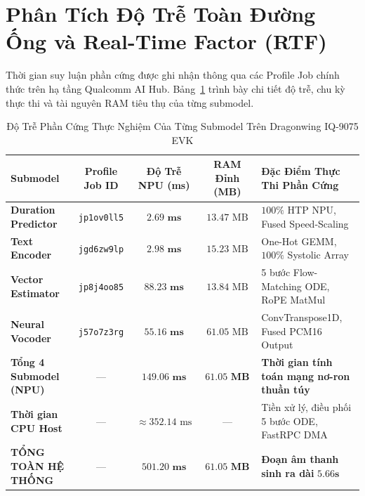 \documentclass[11pt,a4paper,oneside,table]{report}
\begin{document}
\section{Phân Tích Độ Trễ Toàn Đường Ống và Real-Time Factor (RTF)}
Thời gian suy luận phần cứng được ghi nhận thông qua các Profile Job chính thức trên hạ tầng Qualcomm AI Hub. Bảng~\ref{tab:submodel_hardware_latencies} trình bày chi tiết độ trễ, chu kỳ thực thi và tài nguyên RAM tiêu thụ của từng submodel.

\begin{table}[H]
\centering
\small
\sffamily
\caption{Độ Trễ Phần Cứng Thực Nghiệm Của Từng Submodel Trên Dragonwing IQ-9075 EVK}
\label{tab:submodel_hardware_latencies}
\vspace{2mm}
\begin{tabularx}{\textwidth}{l c c c p{4.2cm}}
\toprule
\textbf{Submodel} & \textbf{Profile Job ID} & \textbf{Độ Trễ NPU (ms)} & \textbf{RAM Đỉnh (MB)} & \textbf{Đặc Điểm Thực Thi Phần Cứng} \\
\midrule
\textbf{Duration Predictor} & \texttt{jp1ov0ll5} & $\mathbf{2.69\text{ ms}}$ & $13.47\text{ MB}$ & $100\%$ HTP NPU, Fused Speed-Scaling \\
\addlinespace
\textbf{Text Encoder} & \texttt{jgd6zw9lp} & $\mathbf{2.98\text{ ms}}$ & $15.23\text{ MB}$ & One-Hot GEMM, $100\%$ Systolic Array \\
\addlinespace
\textbf{Vector Estimator} & \texttt{jp8j4oo85} & $\mathbf{88.23\text{ ms}}$ & $13.84\text{ MB}$ & 5 bước Flow-Matching ODE, RoPE MatMul \\
\addlinespace
\textbf{Neural Vocoder} & \texttt{j57o7z3rg} & $\mathbf{55.16\text{ ms}}$ & $61.05\text{ MB}$ & ConvTranspose1D, Fused PCM16 Output \\
\midrule
\textbf{Tổng 4 Submodel (NPU)} & --- & $\mathbf{149.06\text{ ms}}$ & $\mathbf{61.05\text{ MB}}$ & \textbf{Thời gian tính toán mạng nơ-ron thuần túy} \\
\addlinespace
\textbf{Thời gian CPU Host} & --- & $\approx 352.14\text{ ms}$ & --- & Tiền xử lý, điều phối 5 bước ODE, FastRPC DMA \\
\midrule
\textbf{TỔNG TOÀN HỆ THỐNG} & --- & $\mathbf{501.20\text{ ms}}$ & $\mathbf{61.05\text{ MB}}$ & \textbf{Đoạn âm thanh sinh ra dài } $\mathbf{5.66\text{s}}$ \\
\bottomrule
\end{tabularx}
\end{table}
\end{document}
